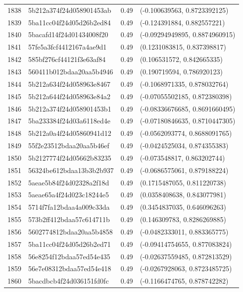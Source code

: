 \begin{table}[ht]
\begin{tabular}{rlrl}
  1838 & 5b212a374f24d058901453ab & 0.49 & (-0.100639563, 0.8723392125) \\ 
  1839 & 5ba11cc04f24d05d26b2ed84 & 0.49 & (-0.124391884, 0.882557221) \\ 
  1840 & 5bacafd14f24d01434008f20 & 0.49 & (-0.09294949895, 0.8874960915) \\ 
  1841 & 57fe5a3fcf4412167a4ae9d1 & 0.49 & (0.1231083815, 0.837398817) \\ 
  1842 & 585bf276cf44121f3e63af84 & 0.49 & (0.106531572, 0.842665335) \\ 
  1843 & 560411b012bdaa20aa5b4946 & 0.49 & (0.190719594, 0.786920123) \\ 
  1844 & 5b212a634f24d058963e8467 & 0.49 & (-0.1068971335, 0.878032764) \\ 
  1845 & 5b212a644f24d058963e84a2 & 0.49 & (-0.07055502185, 0.872380398) \\ 
  1846 & 5b212a374f24d058901453b1 & 0.49 & (-0.08336676685, 0.8691660495) \\ 
  1847 & 5ba233384f24d03a6118ed4e & 0.49 & (-0.07180846635, 0.8710447305) \\ 
  1848 & 5b212a0a4f24d05860941d12 & 0.49 & (-0.0562093774, 0.8688091765) \\ 
  1849 & 55f2e23512bdaa20aa5b46ef & 0.49 & (-0.0424525034, 0.874355383) \\ 
  1850 & 5b2127774f24d05662b83235 & 0.49 & (-0.073548817, 0.863202744) \\ 
  1851 & 56324be612bdaa13b3b2b937 & 0.49 & (-0.0686575061, 0.879188224) \\ 
  1852 & 5aeae5b84f24d02328a2f18d & 0.49 & (0.1715487055, 0.811220738) \\ 
  1853 & 5aeae65a4f24d023c18244e5 & 0.49 & (0.0358408638, 0.843077981) \\ 
  1854 & 5714f7fa12bdaa4a009c33da & 0.49 & (0.3454837035, 0.646096263) \\ 
  1855 & 573b2ff412bdaa57c614711b & 0.49 & (0.146309783, 0.8286269885) \\ 
  1856 & 5602774812bdaa20aa5b4858 & 0.49 & (-0.0482333011, 0.883365775) \\ 
  1857 & 5ba11cc04f24d05d26b2ed71 & 0.49 & (-0.09414754655, 0.877083824) \\ 
  1858 & 56e8254f12bdaa57ed54e435 & 0.49 & (-0.02637559485, 0.872813529) \\ 
  1859 & 56e7e08312bdaa57ed54e418 & 0.49 & (-0.0267928063, 0.8723485725) \\ 
  1860 & 5bacdbcb4f24d036151fd0fc & 0.49 & (-0.1166474765, 0.878742282) \\ 

\end{tabular}
\end{table}
